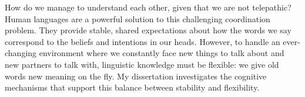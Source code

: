
How do we manage to understand each other, given that we are not telepathic? 
Human languages are a powerful solution to this challenging coordination problem.
They provide stable, shared expectations about how the words we say correspond to the beliefs and intentions in our heads.
However, to handle an ever-changing environment where we constantly face new things to talk about and new partners to talk with, linguistic knowledge must be flexible: we give old words new meaning on the fly.
My dissertation investigates the cognitive mechanisms that support this balance between stability and flexibility. %
